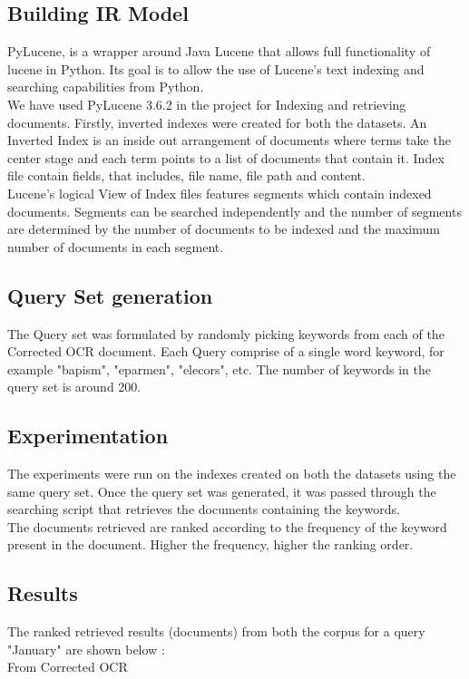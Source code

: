 \subsection{Building IR Model}
PyLucene, is a wrapper around Java Lucene that allows full functionality of  lucene in Python. Its goal is to allow the use of Lucene's text indexing and searching capabilities from Python.\\
We have used PyLucene 3.6.2 in the project for Indexing and retrieving documents. Firstly, inverted indexes were created for both the datasets. An Inverted Index is an inside out arrangement of documents where terms take the center stage and each term points to a list of documents that contain it. Index file  contain fields, that includes, file name, file path and content.\\
Lucene's logical View of Index files features segments which contain indexed documents. Segments can be searched independently and the number of segments are determined by the number of documents to be indexed and the maximum number of documents in each segment.\\
\subsection{Query Set generation}
The Query set was formulated by randomly picking keywords from each of the Corrected OCR document. Each Query comprise of a single word keyword, for example "bapism", "eparmen", "elecors", etc. The number of keywords in the query set is around 200.
\subsection{Experimentation}
The experiments were run on the indexes created on both the datasets using the same query set. Once the query set was generated, it was passed through the searching script that retrieves the documents containing the keywords.\\
 The documents retrieved are ranked according to the frequency of the keyword present in the document. Higher the frequency, higher the ranking order.\\

\subsection{Results}
The ranked retrieved results (documents) from both the corpus for a query "January" are shown below : \\
From Corrected OCR \\

